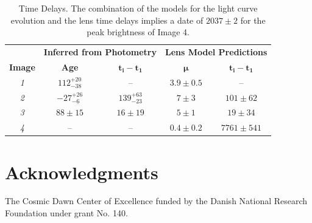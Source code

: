 \documentclass[12pt,dvipsnames]{article}
\begin{document}
\clearpage

\begin{table}
\centering
\begin{tabular}{ccc|cc}
    \multicolumn{1}{c}{}&
    \multicolumn{2}{c}{\textbf{Inferred from Photometry}}&\multicolumn{2}{c}{\textbf{Lens Model Predictions}}\\
    \multicolumn{1}{c}{\textbf{Image}} &\multicolumn{1}{c}{\textbf{Age}} &\multicolumn{1}{c}{$\mathbf{t_i-t_1}$}&\multicolumn{1}{c}{$\mathbf{\mu}$}
    &\multicolumn{1}{c}{$\mathbf{t_i-t_1}$}\\
    
\midrule
\textit{1}  & $112^{+20}_{-38}$ & -- & $3.9\pm0.5$ & --\\
\textit{2} & $-27^{+26}_{-6}$ & $139^{+63}_{-23}$ & $7\pm3$ & $101\pm62$ \\
\textit{3} & $88\pm15$ & $16\pm19$ & $5\pm1$ & $19\pm34$ \\
\textit{4} & -- & -- & $0.4\pm0.2$ & $7761\pm541$\\

\end{tabular}
\caption{\label{tab:time_delays}Time Delays.  The combination of the models for the light curve evolution and the lens time delays implies a date of $2037\pm2$ for the peak brightness of Image 4.}
\end{table}










\section*{Acknowledgments}

The Cosmic Dawn Center of Excellence funded by the Danish National Research Foundation under grant No. 140.
\end{document}
